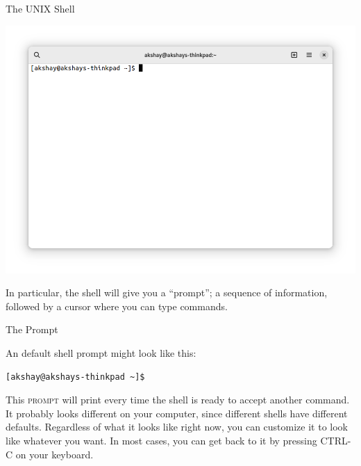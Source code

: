 \begin{frame}{The UNIX Shell}
  \begin{center}
    \includegraphics[width=0.5\paperwidth]{images/bash.png}
  \end{center}
\end{frame}

In particular, the shell will give you a ``prompt''; a sequence of information,
followed by a cursor where you can type commands.

\begin{frame}[fragile]{The Prompt}
  \begin{example}[prompt]
    An default shell prompt might look like this:
    \begin{verbatim}
[akshay@akshays-thinkpad ~]$ 
    \end{verbatim}
  \end{example}

  This \textsc{prompt} will print every time the shell is ready to accept
  another command.  It probably looks different on your computer, since
  different shells have different defaults.  Regardless of what it looks like
  right now, you can customize it to look like whatever you want.  In most
  cases, you can get back to it by pressing \textsc{CTRL-C} on your keyboard.

\end{frame}

